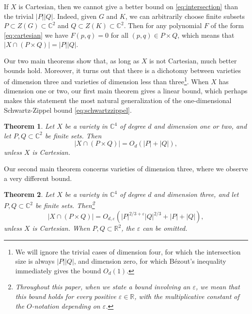 \documentclass{daj}
\newtheorem{theorem}{Theorem}[section]
\theoremstyle{definition}
\newcommand{\C}{\mathbb C}
\newcommand{\R}{\mathbb R}
\newcommand{\eps}{\varepsilon}
\begin{document}

If $X$ is Cartesian, then we cannot give a better bound on \eqref{eq:intersection} than the trivial $|P||Q|$.
Indeed, given $G$ and $K$, we can arbitrarily choose finite subsets $P\subset Z(G)\subset \C^2$ and $Q\subset Z(K)\subset \C^2$.
Then for any polynomial $F$ of the form \eqref{eq:cartesian} we have $F(p,q) = 0$ for all $(p,q)\in P\times Q$, which means that $|X\cap (P\times Q)|=|P||Q|$.

Our two main theorems show that, as long as $X$ is not Cartesian, much better bounds hold.
Moreover, it turns out that there is a dichotomy between varieties of dimension three and varieties of dimension less than three\footnote{We will ignore the trivial cases of dimension four, for which the intersection size is always $|P||Q|$, and dimension zero, for which B\'ezout's inequality immediately gives the bound $O_d(1)$.}.
When $X$ has dimension one or two, our first main theorem gives a linear bound, which perhaps makes this statement the most natural generalization of the one-dimensional Schwartz-Zippel bound \eqref{eq:schwartzzippel}.

\begin{theorem}\label{thm:dimtwo}
Let $X$ be a variety in $\C^4$ of degree $d$ and dimension one or two,
and let $P,Q\subset \C^2$ be finite sets.
Then
\[|X\cap (P\times Q)| = O_d(|P|+|Q|), \]
unless $X$ is Cartesian.
\end{theorem}

Our second main theorem concerns varieties of dimension three, where we observe a very different bound.


\begin{theorem}\label{thm:dimthree}
Let $X$ be a variety in $\C^4$ of degree $d$ and dimension three,
and let $P,Q\subset \C^2$ be finite sets.
Then\footnote{Throughout this paper, when we state a bound involving an $\eps$, we mean that this bound holds for every positive $\eps\in\R$, with the multiplicative constant of the $O$-notation depending on $\eps$.}
\[ |X\cap (P\times Q)| =O_{d,\eps}\left( |P|^{2/3+\eps}|Q|^{2/3}+|P|+|Q|\right),\]
unless $X$ is Cartesian.
When $P,Q\subset \R^2$, the $\eps$ can be omitted.
\end{theorem}
\end{document}
